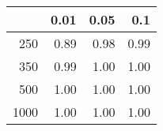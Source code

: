 % 
\begin{tabular}{rrrr}
  \hline
 & 0.01 & 0.05 & 0.1 \\ 
  \hline
250 & 0.89 & 0.98 & 0.99 \\ 
  350 & 0.99 & 1.00 & 1.00 \\ 
  500 & 1.00 & 1.00 & 1.00 \\ 
  1000 & 1.00 & 1.00 & 1.00 \\ 
   \hline
\end{tabular}

